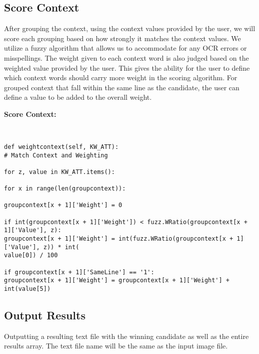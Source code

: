 \subsection{Score Context}

After grouping the context, using the context values provided by
the user, we will score each grouping based on how strongly it matches 
the context values. We utilize a fuzzy algorithm that allows us to accommodate
for any OCR errors or misspellings. The weight given to each context word is also
judged based on the weighted value provided by the user. This gives the ability for
the user to define which context words should carry more weight in the scoring
algorithm. For grouped context that fall within the same line as the candidate, the user
can define a value to be added to the overall weight. 

\bigskip
\noindent
\textbf{Score Context:}
\begin{footnotesize}
\begin{verbatim}


def weightcontext(self, KW_ATT):
# Match Context and Weighting

for z, value in KW_ATT.items():

for x in range(len(groupcontext)):

groupcontext[x + 1]['Weight'] = 0

if int(groupcontext[x + 1]['Weight']) < fuzz.WRatio(groupcontext[x + 1]['Value'], z):
groupcontext[x + 1]['Weight'] = int(fuzz.WRatio(groupcontext[x + 1]['Value'], z)) * int(
value[0]) / 100

if groupcontext[x + 1]['SameLine'] == '1':
groupcontext[x + 1]['Weight'] = groupcontext[x + 1]['Weight'] + int(value[5])

\end{verbatim}
\end{footnotesize}

\subsection{Output Results}

Outputting a resulting text file with the winning candidate as well as
the entire results array. The text file name will be the same as the input 
image file.

